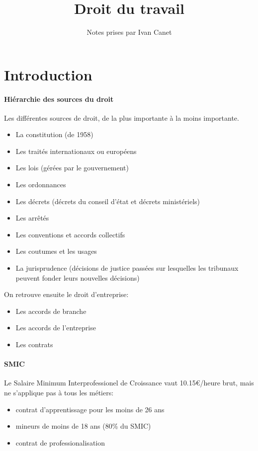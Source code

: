 \documentclass[a4paper,10pt,french,openany]{memoir}
\title{Droit du travail}
\author{Notes prises par Ivan Canet}
\begin{document}
\maketitle
\tableofcontents

\section{Introduction}

\paragraph{Hiérarchie des sources du droit}
Les différentes sources de droit, de la plus importante à la moins importante.
\begin{itemize}
 \item La constitution (de 1958)
 \item Les traités internationaux ou européens
 \item Les lois (gérées par le gouvernement)
 \item Les ordonnances
 \item Les décrets (décrets du conseil d'état et décrets ministériels)
 \item Les arrêtés
 \item Les conventions et accords collectifs
 \item Les coutumes et les usages
 \item La jurisprudence (décisions de justice passées sur lesquelles les tribunaux peuvent fonder leurs nouvelles décisions)
\end{itemize}

On retrouve ensuite le droit d'entreprise:
\begin{itemize}
 \item Les accords de branche
 \item Les accords de l'entreprise
 \item Les contrats
\end{itemize}

\paragraph{SMIC}
Le Salaire Minimum Interprofessionel de Croissance vaut 10.15€/heure brut, mais ne s'applique pas à tous les métiers:
\begin{itemize}
 \item contrat d'apprentissage pour les moins de 26 ans
 \item mineurs de moins de 18 ans (80\% du SMIC)
 \item contrat de professionalisation
\end{itemize}
\end{document}
